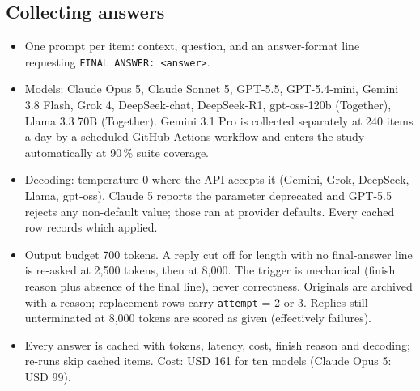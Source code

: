 \documentclass[11pt]{article}
\begin{document}
\subsection{Collecting answers}
\begin{itemize}
\item One prompt per item: context, question, and an answer-format line requesting \texttt{FINAL ANSWER: <answer>}.
\item Models: Claude Opus 5, Claude Sonnet 5, GPT-5.5, GPT-5.4-mini, Gemini 3.8 Flash, Grok 4, DeepSeek-chat, DeepSeek-R1, gpt-oss-120b (Together), Llama 3.3 70B (Together). Gemini 3.1 Pro is collected separately at 240 items a day by a scheduled GitHub Actions workflow and enters the study automatically at 90\,\% suite coverage.
\item Decoding: temperature 0 where the API accepts it (Gemini, Grok, DeepSeek, Llama, gpt-oss). Claude 5 reports the parameter deprecated and GPT-5.5 rejects any non-default value; those ran at provider defaults. Every cached row records which applied.
\item Output budget 700 tokens. A reply cut off for length with no final-answer line is re-asked at 2,500 tokens, then at 8,000. The trigger is mechanical (finish reason plus absence of the final line), never correctness. Originals are archived with a reason; replacement rows carry \texttt{attempt} = 2 or 3. Replies still unterminated at 8,000 tokens are scored as given (effectively failures).
\item Every answer is cached with tokens, latency, cost, finish reason and decoding; re-runs skip cached items. Cost: USD 161 for ten models (Claude Opus 5: USD 99).
\end{itemize}
\end{document}
